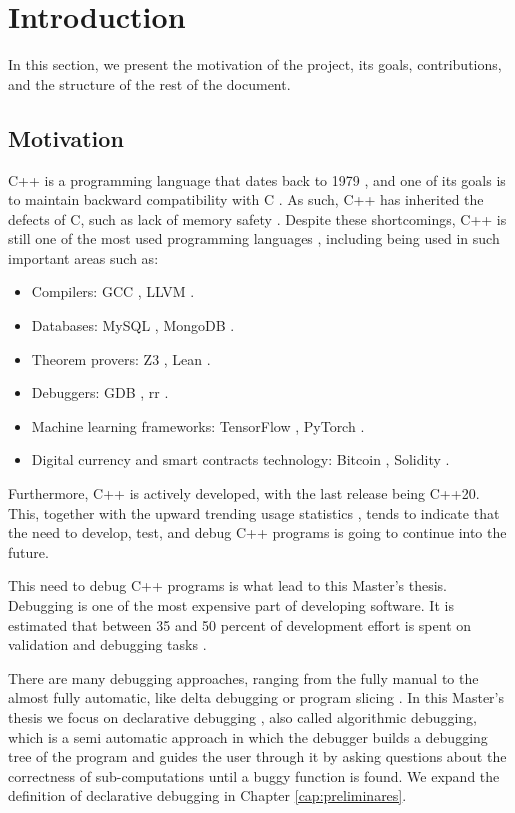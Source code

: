 \chapter{Introduction}
\label{cap:introduccion}

\chapterquote{}{}


In this section, we present the motivation of the project, its goals, contributions, and the structure of the rest of the document.

\section{Motivation}
C++ is a programming language that dates back to 1979 \cite{cppHistory}, and one of its goals is to maintain backward compatibility with C \cite{cCompat}. As such, C++ has inherited the defects of C, such as lack of memory safety \cite{practicalmemorysafety}.
Despite these shortcomings, C++ is still one of the most used programming languages \cite{popularityPL}, including being used in such important areas such as:
\begin{itemize}
    \item Compilers: GCC \cite{gcc}, LLVM \cite{llvm}.
    \item Databases: MySQL \cite{mysql}, MongoDB \cite{mongodb}.
    \item Theorem provers: Z3 \cite{z3}, Lean \cite{lean}.
    \item Debuggers: GDB \cite{gdb}, rr \cite{rr}.
    \item Machine learning frameworks: TensorFlow \cite{tensorflow}, PyTorch \cite{pytorch}.
    \item Digital currency and smart contracts technology: Bitcoin \cite{bitcoin}, Solidity \cite{solidity}.
\end{itemize}

Furthermore, C++ is actively developed, with the last release being C++20. This, together with the upward trending usage statistics \cite{popularityPL}, tends to indicate that the need to develop, test, and debug C++ programs is going to continue into the future.

This need to debug C++ programs is what lead to this Master's thesis.
Debugging is one of the most expensive part of developing software.
It is estimated that between 35 and 50 percent of development effort is spent on validation and debugging tasks \cite{debuggingMindset}.

There are many debugging approaches, ranging from the fully manual to the almost fully automatic, like delta debugging or program slicing \cite{WhyProgramsFail}. In this Master's thesis we focus on declarative debugging \cite{shapiro1982algorithmic}, also called algorithmic debugging, which is a semi automatic approach in which the debugger builds a debugging tree of the program and guides the user through it by asking questions about the correctness of sub-computations until a buggy function is found. We expand the definition of declarative debugging in Chapter \ref{cap:preliminares}.

